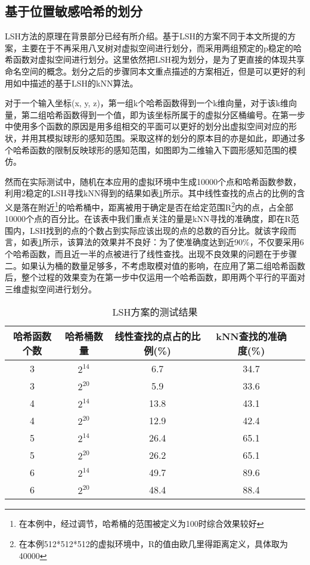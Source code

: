 \subsection{基于位置敏感哈希的划分}
\par
LSH方法的原理在背景部分已经有所介绍。基于LSH的方案不同于本文所提的方案，主要在于不再采用八叉树对虚拟空间进行划分，而采用两组预定的p稳定的哈希函数对虚拟空间进行划分。这里依然把LSH视为划分，是为了更直接的体现共享命名空间的概念。划分之后的步骤同本文重点描述的方案相近，但是可以更好的利用如\cite{LSHKNNRef}中描述的基于LSH的kNN算法。
\par
对于一个输入坐标(x, y, z)，第一组k个哈希函数得到一个k维向量，对于该k维向量，第二组哈希函数得到一个值，即为该坐标所属于的虚拟分区桶编号。在第一步中使用多个函数的原因是用多组相交的平面可以更好的划分出虚拟空间对应的形状，并用其模拟球形的感知范围。采取这样的划分的原本目的亦是如此，即通过多个哈希函数的限制反映球形的感知范围，如图即为二维输入下圆形感知范围的模仿。
\par
然而在实际测试中，随机在本应用的虚拟环境中生成10000个点和哈希函数参数，利用2稳定的LSH寻找kNN得到的结果如表\ref{tab:LSHTable}所示。其中线性查找的点占的比例的含义是落在附近\footnote{在本例中，经过调节，哈希桶的范围被定义为100时综合效果较好}的哈希桶中，距离被用于确定是否在给定范围R\footnote{在本例512*512*512的虚拟环境中，R的值由欧几里得距离定义，具体取为40000}内的点，占全部10000个点的百分比。在该表中我们重点关注的量是kNN寻找的准确度，即在R范围内，LSH找到的点的个数占到实际应该出现的点的总数的百分比。就该字段而言，如表\ref{tab:LSHTable}所示，该算法的效果并不良好：为了使准确度达到近90\%，不仅要采用6个哈希函数，而且近一半的点被进行了线性查找。出现不良效果的问题在于步骤二。如果认为桶的数量足够多，不考虑取模对值的影响，在应用了第二组哈希函数后，整个过程的效果变为在第一步中仅运用一个哈希函数，即用两个平行的平面对三维虚拟空间进行划分。
\begin{table}[h!]
          \centering
          \caption{LSH方案的测试结果}
          \label{tab:LSHTable}
          \wuhao
          \begin{tabular}{ccccc} \toprule 
		哈希函数个数 & 哈希桶数量 & 线性查找的点占的比例(\%) & kNN查找的准确度(\%) \\ \midrule
          	3 &    $2^{14}$ &  6.7  &  34.7  \\ 
		3 &    $2^{20}$ &  5.9  &  33.6  \\
		4 &    $2^{14}$ &  13.8 & 43.1 \\ 
		4 &    $2^{20}$ &  12.9 & 42.4 \\
		5 &    $2^{14}$ &  26.4 & 65.1 \\
		5 &    $2^{20}$ &  26.2 & 65.1 \\
		6 &    $2^{14}$ &  49.7 & 89.6 \\
		6 &    $2^{20}$ &  48.4 & 88.4 \\
\bottomrule
          \end{tabular}
\end{table}
